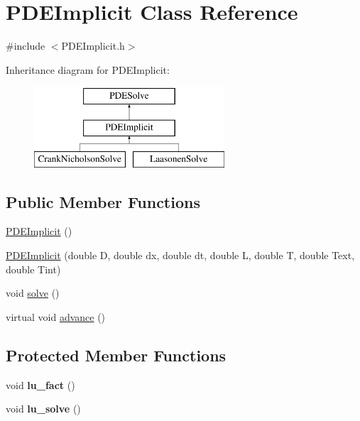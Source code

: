 \hypertarget{class_p_d_e_implicit}{}\section{P\+D\+E\+Implicit Class Reference}
\label{class_p_d_e_implicit}


{\ttfamily \#include $<$P\+D\+E\+Implicit.\+h$>$}

Inheritance diagram for P\+D\+E\+Implicit\+:\begin{figure}[H]
\begin{center}
\leavevmode
\includegraphics[height=3.000000cm]{class_p_d_e_implicit}
\end{center}
\end{figure}
\subsection*{Public Member Functions}
\begin{DoxyCompactItemize}
\item 
\hyperlink{class_p_d_e_implicit_a6eca74fdfc3e0173bc81562548bbbdc9}{P\+D\+E\+Implicit} ()
\item 
\hyperlink{class_p_d_e_implicit_a95e1d8572ae2356554f25633391f02f2}{P\+D\+E\+Implicit} (double D, double dx, double dt, double L, double T, double Text, double Tint)
\item 
void \hyperlink{class_p_d_e_implicit_ace06b1a56c2766ca8d4bc95669d21d12}{solve} ()
\item 
virtual void \hyperlink{class_p_d_e_implicit_a60980fe1e316329ab95ad179fce5a88b}{advance} ()
\end{DoxyCompactItemize}
\subsection*{Protected Member Functions}
\begin{DoxyCompactItemize}
\item 
\mbox{\label{class_p_d_e_implicit_afa24d3aa2a58330c693c351f917fdaa7}} 
void {\bfseries lu\+\_\+fact} ()
\item 
\mbox{\label{class_p_d_e_implicit_af27dc1837e1e1b6f2e930f35441402de}} 
void {\bfseries lu\+\_\+solve} ()
\end{DoxyCompactItemize}
